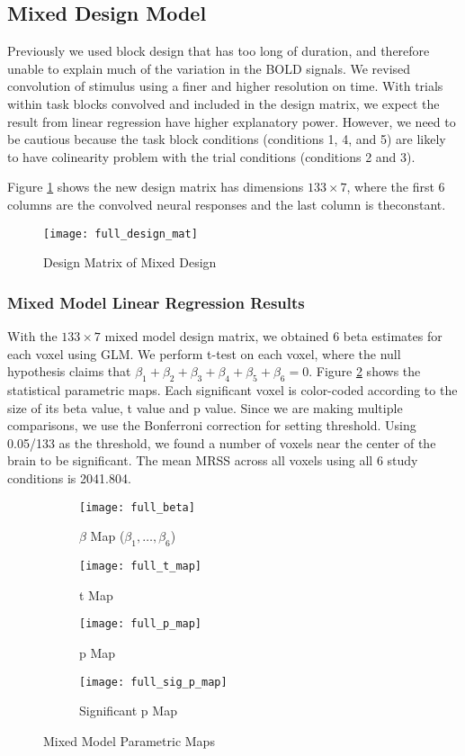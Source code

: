 \subsection{Mixed Design Model} 

Previously we used block design that has too long of duration, and therefore
unable to explain much of the variation in the BOLD signals. We revised
convolution of stimulus using a finer and higher resolution on time. With trials
within task blocks convolved and included in the design matrix, we expect the
result from linear regression have higher explanatory power. However, we need to
be cautious because the task block conditions (conditions 1, 4, and 5) are
likely to have colinearity problem with the trial conditions (conditions 2 and 3).

Figure \ref{fig:mixDM} shows the new design matrix has dimensions $133 \times 7$, 
where the first 6 columns are the convolved neural responses and the last column is 
theconstant.  

\begin{figure}[!h] 
\texttt{[image: full\_design\_mat]} 
\centering
\caption{Design Matrix of Mixed Design\label{fig:mixDM}}
\end{figure}

\subsubsection{Mixed Model Linear Regression Results} 

With the $133 \times 7$ mixed model design matrix, we obtained 6 beta estimates
for each voxel using GLM. We perform t-test on each voxel, where the null
hypothesis claims that $\beta_1 + \beta_2 + \beta_3 + \beta_4 + \beta_5 +
\beta_6= 0$. Figure \ref{fig:mixMF} shows the statistical parametric maps. Each 
significant voxel is color-coded according to the size of its beta value, t value and p 
value. Since we are making multiple comparisons, we use the Bonferroni correction
for setting threshold. Using 0.05/133 as the threshold, we found a number of voxels 
near the center of the brain to be significant. The mean MRSS across all voxels 
using all 6 study conditions is 2041.804.

\begin{figure}[!h]
\begin{subfigure}{.5\textwidth}
  \centering
  \texttt{[image: full\_beta]}
  \caption{$\beta$ Map ($\beta_1, \ldots, \beta_6$)}
\end{subfigure}%
\begin{subfigure}{.4\textwidth}
  \centering
  \texttt{[image: full\_t\_map]}
  \caption{t Map}
\end{subfigure}
\begin{subfigure}{.5\textwidth}
  \centering
  \texttt{[image: full\_p\_map]}
  \caption{p Map}
\end{subfigure}%
\begin{subfigure}{.5\textwidth}
  \centering
  \texttt{[image: full\_sig\_p\_map]}
  \caption{Significant p Map} 
\end{subfigure}
\caption{Mixed Model Parametric Maps\label{fig:mixMF}}
\end{figure}

